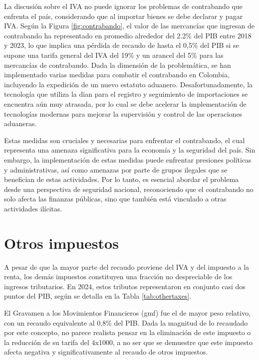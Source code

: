 

La discusión sobre el IVA no puede ignorar los problemas de contrabando que enfrenta el país, considerando que al importar bienes se debe declarar y pagar IVA.  Según la Figura \ref{fig:contrabando}, el valor de las mercancías que ingresan de contrabando ha representado en promedio alrededor del 2.2\% del PIB entre 2018 y 2023, lo que implica una pérdida de recaudo de hasta el 0,5\% del PIB si se supone una tarifa general del IVA del 19\% y un arancel del 5\% para las mercancías de contrabando. Dada la dimensión de la problemática, se han implementado varias medidas para combatir el contrabando en Colombia, incluyendo la expedición de un nuevo estatuto aduanero. Desafortunadamente, la tecnología que utiliza la \gls{dian} para el registro y seguimiento de importaciones se encuentra aún muy atrasada, por lo cual se debe acelerar la implementación de tecnologías modernas para mejorar la supervisión y control de las operaciones aduaneras.  

Estas medidas son cruciales y necesarias para enfrentar el contrabando, el cual representa una amenaza significativa para la economía y la seguridad del país. Sin embargo, la implementación de estas medidas puede enfrentar presiones políticas y administrativas, así como amenazas por parte de grupos ilegales que se benefician de estas actividades. Por lo tanto, es esencial abordar el problema desde una perspectiva de seguridad nacional, reconociendo que el contrabando no solo afecta las finanzas públicas, sino que también está vinculado a otras actividades ilícitas.

\section{Otros impuestos}

A pesar de que la mayor parte del recaudo proviene del IVA y del impuesto a la renta, los demás impuestos constituyen una fracción no despreciable de los ingresos tributarios. En 2024, estos tributos representaron en conjunto casi dos puntos del PIB, según se detalla en la Tabla \ref{tab:othertaxes}. 



El Gravamen a los Movimientos Financieros (\gls{gmf}) fue el de mayor peso relativo, con un recaudo equivalente al 0,8\% del PIB. Dada la magnitud de lo recaudado por este concepto, no parece realista pensar en la eliminación de este impuesto o la reducción de su tarifa del 4x1000, a no ser que se demuestre que este impuesto afecta negativa y significativamente al recaudo de otros impuestos. 

